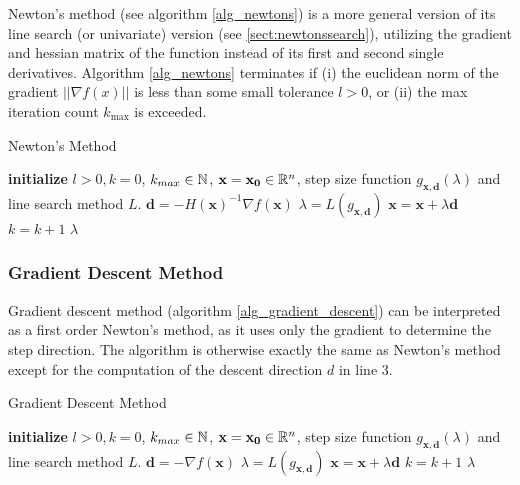 \documentclass[a4paper,english,titlepage,12pt]{article}
\newcommand{\vect}[1]{\ensuremath{\mathbf{#1}}}
\newcommand{\norm}[1]{\ensuremath\Vert #1 \Vert}
\newcommand{\R}{\ensuremath\mathbb{R}}
\newcommand{\N}{\ensuremath\mathbb{N}}
\begin{document}
Newton's method (see algorithm \ref{alg_newtons}) is a more general version of its line search (or univariate) version (see \ref{sect:newtonssearch}), utilizing the gradient and hessian matrix of the function instead of its first and second single derivatives. Algorithm \ref{alg_newtons} terminates if (i) the euclidean norm of the gradient $||\nabla f(x)||$ is less than some small tolerance $l > 0$, or (ii) the max iteration count $k_{\text{max}}$ is exceeded.  

\begin{algorithm}[H]
\caption{Newton's Method}
\label{alg_newtons}
\begin{algorithmic}[1]
\STATE \textbf{initialize} $l > 0, k = 0$, $k_{max} \in \N$, $\vect{x} = \vect{x_0} \in \R^n$, step size function $g_{\vect{x}, \vect{d}}(\lambda)$ and line search method $L$.
\WHILE{$\norm{\nabla f(\vect{x})} > l$ \AND $k < k_{max}$}
    \STATE $\vect{d} = -H(\vect{x})^{-1} \nabla f(\vect{x})$
    \STATE $\lambda = L(g_{\vect{x}, \vect{d}})$
    \STATE $\vect{x} = \vect{x} + \lambda \vect{d}$
    \STATE $k = k + 1$
\ENDWHILE
\RETURN $\lambda$
\end{algorithmic}
\end{algorithm}


\subsubsection{Gradient Descent Method}


Gradient descent method (algorithm \ref{alg_gradient_descent}) can be interpreted as a first order Newton's method, as it uses only the gradient to determine the step direction. The algorithm is otherwise exactly the same as Newton's method except for the computation of the descent direction $d$ in line 3.

\begin{algorithm}[H]
\caption{Gradient Descent Method}
\label{alg_gradient_descent}
\begin{algorithmic}[1]
\STATE \textbf{initialize} $l > 0, k = 0$, $k_{max} \in \N$, $\vect{x} = \vect{x_0} \in \R^n$, step size function $g_{\vect{x}, \vect{d}}(\lambda)$ and line search method $L$.
\WHILE{$\norm{\nabla f(\vect{x})} > l$ \AND $k < k_{max}$}
    \STATE $\vect{d} = -\nabla f(\vect{x})$
    \STATE $\lambda = L(g_{\vect{x}, \vect{d}})$
    \STATE $\vect{x} = \vect{x} + \lambda \vect{d}$
    \STATE $k = k + 1$
\ENDWHILE
\RETURN $\lambda$
\end{algorithmic}
\end{algorithm}
\end{document}
